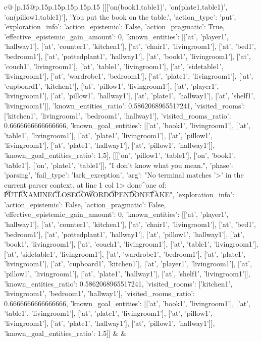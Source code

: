\documentclass{article}
\begin{document}
{\begin{supertabular}{c@{$\;$}|p{.15\linewidth}@{}p{.15\linewidth}p{.15\linewidth}p{.15\linewidth}p{.15\linewidth}p{.15\linewidth}}
{{{	 [[['on(book1,table1)', 'on(plate1,table1)', 'on(pillow1,table1)'], 'You put the book on the table.', {'action_type': 'put', 'exploration_info': {'action_epistemic': False, 'action_pragmatic': True, 'effective_epistemic_gain_amount': 0, 'known_entities': [['at', 'player1', 'hallway1'], ['at', 'counter1', 'kitchen1'], ['at', 'chair1', 'livingroom1'], ['at', 'bed1', 'bedroom1'], ['at', 'pottedplant1', 'hallway1'], ['at', 'book1', 'livingroom1'], ['at', 'couch1', 'livingroom1'], ['at', 'table1', 'livingroom1'], ['at', 'sidetable1', 'livingroom1'], ['at', 'wardrobe1', 'bedroom1'], ['at', 'plate1', 'livingroom1'], ['at', 'cupboard1', 'kitchen1'], ['at', 'pillow1', 'livingroom1'], ['at', 'player1', 'livingroom1'], ['at', 'pillow1', 'hallway1'], ['at', 'plate1', 'hallway1'], ['at', 'shelf1', 'livingroom1']], 'known_entities_ratio': 0.5862068965517241, 'visited_rooms': ['kitchen1', 'livingroom1', 'bedroom1', 'hallway1'], 'visited_rooms_ratio': 0.6666666666666666, 'known_goal_entities': [['at', 'book1', 'livingroom1'], ['at', 'table1', 'livingroom1'], ['at', 'plate1', 'livingroom1'], ['at', 'pillow1', 'livingroom1'], ['at', 'plate1', 'hallway1'], ['at', 'pillow1', 'hallway1']], 'known_goal_entities_ratio': 1.5}}], [[['on', 'pillow1', 'table1'], ['on', 'book1', 'table1'], ['on', 'plate1', 'table1']], "I don't know what you mean.", {'phase': 'parsing', 'fail_type': 'lark_exception', 'arg': "No terminal matches '>' in the current parser context, at line 1 col 1\n\n> done\n^\nExpected one of: \n\t* PUT\n\t* EXAMINE\n\t* CLOSE\n\t* GO\n\t* WORD\n\t* OPEN\n\t* DONE\n\t* TAKE\n", 'exploration_info': {'action_epistemic': False, 'action_pragmatic': False, 'effective_epistemic_gain_amount': 0, 'known_entities': [['at', 'player1', 'hallway1'], ['at', 'counter1', 'kitchen1'], ['at', 'chair1', 'livingroom1'], ['at', 'bed1', 'bedroom1'], ['at', 'pottedplant1', 'hallway1'], ['at', 'pillow1', 'hallway1'], ['at', 'book1', 'livingroom1'], ['at', 'couch1', 'livingroom1'], ['at', 'table1', 'livingroom1'], ['at', 'sidetable1', 'livingroom1'], ['at', 'wardrobe1', 'bedroom1'], ['at', 'plate1', 'livingroom1'], ['at', 'cupboard1', 'kitchen1'], ['at', 'player1', 'livingroom1'], ['at', 'pillow1', 'livingroom1'], ['at', 'plate1', 'hallway1'], ['at', 'shelf1', 'livingroom1']], 'known_entities_ratio': 0.5862068965517241, 'visited_rooms': ['kitchen1', 'livingroom1', 'bedroom1', 'hallway1'], 'visited_rooms_ratio': 0.6666666666666666, 'known_goal_entities': [['at', 'book1', 'livingroom1'], ['at', 'table1', 'livingroom1'], ['at', 'plate1', 'livingroom1'], ['at', 'pillow1', 'livingroom1'], ['at', 'plate1', 'hallway1'], ['at', 'pillow1', 'hallway1']], 'known_goal_entities_ratio': 1.5}}]] 
	  } 
	   } 
	   } 
	 & & \\ 
 


\end{supertabular}}
\end{document}
